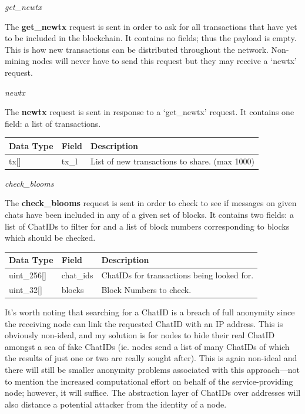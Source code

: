 \documentclass{article}
\begin{document}
\begin{center}
    \Large \textit{get\_newtx}
\end{center}
The \textbf{get\_newtx} request is sent in order to ask for all transactions that have yet to be included in the blockchain. It contains no fields; thus the payload is empty. This is how new transactions can be distributed throughout the network. Non-mining nodes will never have to send this request but they may receive a `newtx' request.

\begin{center}
    \Large \textit{newtx}
\end{center}
The \textbf{newtx} request is sent in response to a `get\_newtx' request. It contains one field: a list of transactions.
\begin{table}[H]
\centering
\begin{tabular}{|p{2.2cm}|p{3cm}|p{5.5cm}|}
\hline
\rowcolor{tblgrey}
Data Type   & Field       & Description\\ \hline
tx[\hspace{0.05cm}] & tx\_l & List of new transactions to share. (max 1000)                   \\ \hline
\end{tabular}
\end{table}

\begin{center}
    \Large \textit{check\_blooms}
\end{center}
The \textbf{check\_blooms} request is sent in order to check to see if messages on given chats have been included in any of a given set of blocks. It contains two fields: a list of ChatIDs to filter for and a list of block numbers corresponding to blocks which should be checked.
\begin{table}[H]
\centering
\begin{tabular}{|p{2.2cm}|p{3cm}|p{5.5cm}|}
\hline
\rowcolor{tblgrey}
Data Type   & Field       & Description\\ \hline
uint\_256[\hspace{0.05cm}]& chat\_ids    & ChatIDs for transactions being looked for.   \\ \hline
uint\_32[\hspace{0.05cm}] & blocks  & Block Numbers to check.       \\ \hline
\end{tabular}
\end{table}
It's worth noting that searching for a ChatID is a breach of full anonymity since the receiving node can link the requested ChatID with an IP address. This is obviously non-ideal, and my solution is for nodes to hide their real ChatID amongst a sea of fake ChatIDs (ie. nodes send a list of many ChatIDs of which the results of just one or two are really sought after). This is again non-ideal and there will still be smaller anonymity problems associated with this approach---not to mention the increased computational effort on behalf of the service-providing node; however, it will suffice. The abstraction layer of ChatIDs over addresses will also distance a potential attacker from the identity of a node.
\end{document}
